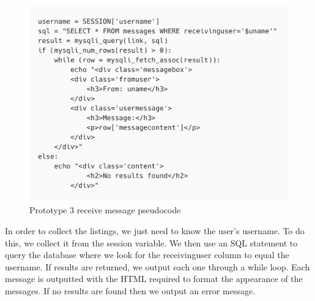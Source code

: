  \begin{figure}[H]
     \centering
     \includegraphics[scale=0.4]{ch3_developing/proto3/message_recieve.png}
     \caption{Prototype 3 receive message pseudocode}
     \label{fig:proto3_registeralg}
 \end{figure} 
In order to collect the listings, we just need to know the user’s username. To do this, we collect it from the session variable. We then use an SQL statement to query the database where we look for the receivinguser column to equal the username. If results are returned, we output each one through a while loop. Each message is outputted with the HTML required to format the appearance of the messages. If no results are found then we output an error message. 

